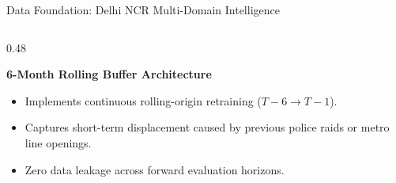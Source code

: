 \documentclass[aspectratio=169,10pt]{beamer}
\begin{document}
\begin{frame}{Data Foundation: Delhi NCR Multi-Domain Intelligence}
\begin{columns}[T]
    \begin{column}{0.48\textwidth}
      \begin{block}{\textbf{6-Month Rolling Buffer Architecture}}
        \footnotesize
        \begin{itemize}\itemsep=0.2em
          \item Implements continuous rolling-origin retraining ($T-6 \to T-1$).
          \item Captures short-term displacement caused by previous police raids or metro line openings.
          \item Zero data leakage across forward evaluation horizons.
        \end{itemize}
      \end{block}
    \end{column}
  \end{columns}
\end{frame}
\end{document}
